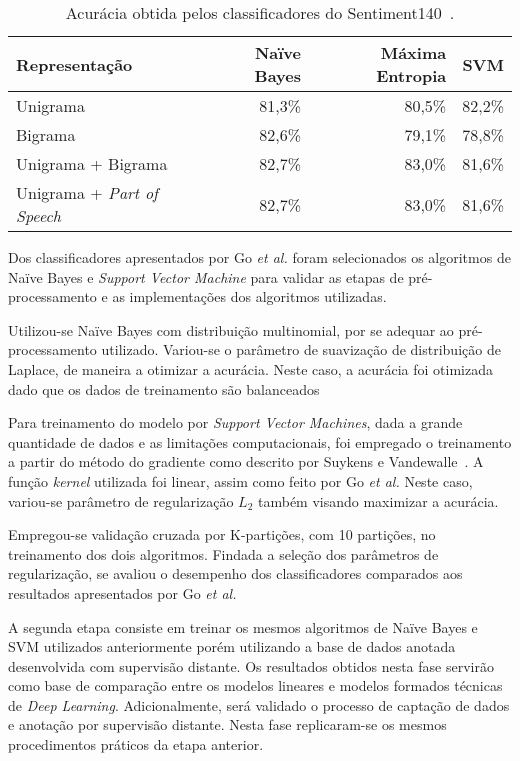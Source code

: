 \begin{table}[h]
    \begin{center}
        \begin{tabular}{| l | r | r | r |}
        \hline
        \textbf{Representação} & \textbf{Naïve Bayes} & \textbf{Máxima Entropia} & \textbf{SVM} \\ \hline
        Unigrama & 81,3\% & 80,5\% & 82,2\% \\ \hline
        Bigrama &  82,6\% & 79,1\% & 78,8\% \\ \hline
        Unigrama + Bigrama & 82,7\% & 83,0\% & 81,6\% \\ \hline
        Unigrama + \textit{Part of Speech} & 82,7\% & 83,0\% & 81,6\% \\ \hline
        \end{tabular}
        \caption{Acurácia obtida pelos classificadores do Sentiment140~\cite{go09}.}
        \label{tab:go}
    \end{center}
\end{table}

Dos classificadores apresentados por Go \textit{et al.} foram selecionados os algoritmos de Naïve Bayes e
\textit{Support Vector Machine} para validar as etapas de pré-processamento e as implementações dos algoritmos
utilizadas.

Utilizou-se Naïve Bayes com distribuição multinomial, por se adequar ao pré-processamento utilizado.
Variou-se o parâmetro de suavização de distribuição de Laplace, de maneira a otimizar a acurácia.
Neste caso, a acurácia foi otimizada dado que os dados de treinamento são balanceados

Para treinamento do modelo por \textit{Support Vector Machines}, dada a grande quantidade de dados e as limitações
computacionais, foi empregado o treinamento a partir do método do gradiente como descrito por Suykens e
Vandewalle~\cite{suykens99}.
A função \textit{kernel} utilizada foi linear, assim como feito por Go \textit{et al.}
Neste caso, variou-se parâmetro de regularização $L_{2}$ também visando maximizar a acurácia.

Empregou-se validação cruzada por K-partições, com 10 partições, no treinamento dos dois algoritmos.
Findada a seleção dos parâmetros de regularização, se avaliou o desempenho dos classificadores comparados aos resultados
apresentados por Go \textit{et al.}

A segunda etapa consiste em treinar os mesmos algoritmos de Naïve Bayes e SVM utilizados anteriormente porém utilizando
a base de dados anotada desenvolvida com supervisão distante.
Os resultados obtidos nesta fase servirão como base de comparação entre os modelos lineares e modelos formados técnicas
de \textit{Deep Learning}.
Adicionalmente, será validado o processo de captação de dados e anotação por supervisão distante.
Nesta fase replicaram-se os mesmos procedimentos práticos da etapa anterior.

